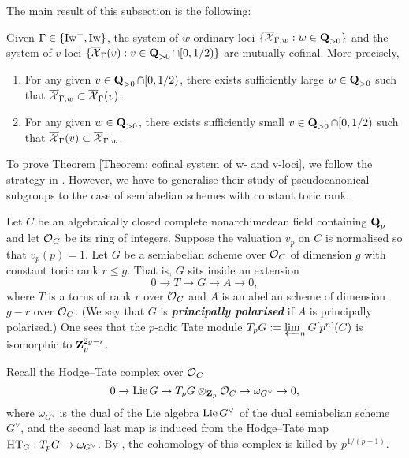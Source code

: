 The main result of this subsection is the following:

\begin{Theorem}\label{Theorem: cofinal system of w- and v-loci}
Given $\Gamma \in \{\operatorname{Iw}^+, \operatorname{Iw}\}$, the system of $w$-ordinary loci $\{\overline{\operatorname{\mathcal{X}}}_{\Gamma, w} : w\in \operatorname{\mathbf{Q}}_{>0}\}$ and the system of $v$-loci $\{\overline{\operatorname{\mathcal{X}}}_{\Gamma}(v): v\in \operatorname{\mathbf{Q}}_{>0}\cap [0, 1/2)\}$ are mutually cofinal. More precisely, \begin{enumerate}
    \item[(i)] For any given $v\in \operatorname{\mathbf{Q}}_{>0}\cap [0, 1/2)$, there exists sufficiently large $w\in \operatorname{\mathbf{Q}}_{>0}$ such that $\overline{\operatorname{\mathcal{X}}}_{\Gamma, w}\subset \overline{\operatorname{\mathcal{X}}}_{\Gamma}(v)$.
    \item[(ii)] For any given $w\in \operatorname{\mathbf{Q}}_{>0}$, there exists sufficiently small $v\in \operatorname{\mathbf{Q}}_{>0}\cap [0, 1/2)$ such that $\overline{\operatorname{\mathcal{X}}}_{\Gamma}(v) \subset \overline{\operatorname{\mathcal{X}}}_{\Gamma, w}$.
\end{enumerate}
\end{Theorem}

To prove Theorem \ref{Theorem: cofinal system of w- and v-loci}, we follow the strategy in \cite[\S 2.3]{CHJ-2017}. However, we have to generalise their study of pseudocanonical subgroups to the case of semiabelian schemes with constant toric rank.

Let $C$ be an algebraically closed complete nonarchimedean field containing $\operatorname{\mathbf{Q}}_p$ and let $\operatorname{\mathcal{O}}_C$ be its ring of integers. Suppose the valuation $v_p$ on $C$ is normalised so that $v_p(p)=1$. Let $G$ be a semiabelian scheme over $\operatorname{\mathcal{O}}_C$ of dimension $g$ with constant toric rank $r \leq g$. That is, $G$ sits inside an extension \[
    0 \rightarrow T \rightarrow G \rightarrow A \rightarrow 0,
\] where $T$ is a torus of rank $r$ over $\operatorname{\mathcal{O}}_C$ and $A$ is an abelian scheme of dimension $g-r$ over $\operatorname{\mathcal{O}}_C$. (We say that $G$ is \textit{\textbf{principally polarised}} if $A$ is principally polarised.) One sees that the $p$-adic Tate module $T_p G := \varprojlim_{n} G[p^n](C)$ is isomorphic to $\operatorname{\mathbf{Z}}_p^{2g-r}$. 

Recall the Hodge--Tate complex over $\operatorname{\mathcal{O}}_C$ \[
    0 \rightarrow \operatorname{Lie} G \rightarrow T_p G\otimes_{\operatorname{\mathbf{Z}}_p}\operatorname{\mathcal{O}}_C \rightarrow \omega_{G^{\vee}} \rightarrow 0,
\]  where ${\omega}_{G^{\vee}}$ is the dual of the Lie algebra $\operatorname{Lie} G^{\vee}$ of the dual semiabelian scheme $G^{\vee}$, and the second last map is induced from the Hodge--Tate map $\operatorname{HT}_G:T_pG\rightarrow \omega_{G^{\vee}}$. By \cite[Th\'eor\`eme II. 1.1]{Fargues-Genestier-Lafforgue}, the cohomology of this complex is killed by $p^{1/(p-1)}$.  

